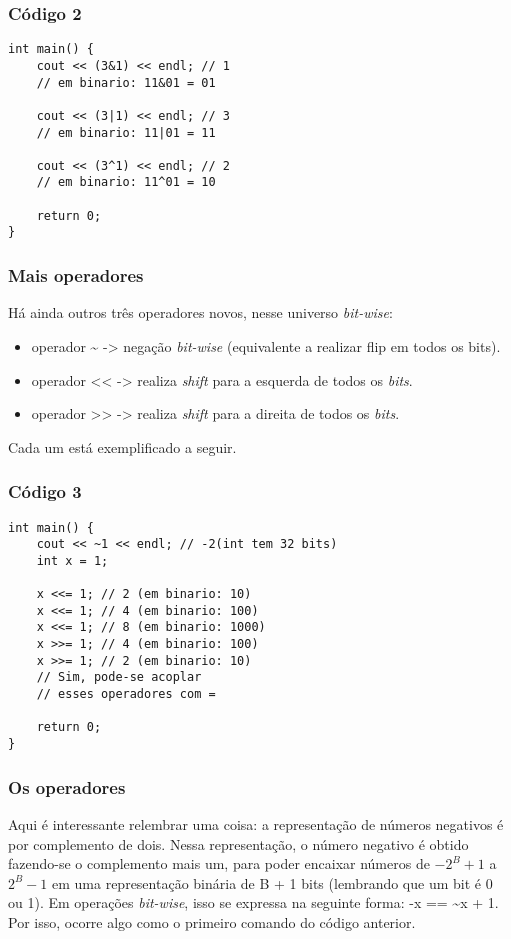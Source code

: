 \documentclass{beamer}
\begin{document}
	\begin{frame}[fragile]
	\frametitle{Código 2}
		\begin{lstlisting}
int main() {
    cout << (3&1) << endl; // 1
    // em binario: 11&01 = 01
	
    cout << (3|1) << endl; // 3
    // em binario: 11|01 = 11

    cout << (3^1) << endl; // 2
    // em binario: 11^01 = 10

    return 0;
}
		\end{lstlisting}
	\end{frame}

	\begin{frame}
	\frametitle{Mais operadores}
	Há ainda outros três operadores novos, nesse universo \textit{bit-wise}:

	\begin{itemize}
		\item operador \~{} -> negação \textit{bit-wise} (equivalente a realizar flip em todos
		os bits).
		\item operador << -> realiza \textit{shift} para a esquerda de todos os \textit{bits}.
		\item operador >> -> realiza \textit{shift} para a direita de todos os \textit{bits}.
	\end{itemize}
	Cada um está exemplificado a seguir.
	\end{frame}

	\begin{frame}[fragile]
	\frametitle{Código 3}
		\begin{lstlisting}
int main() {
    cout << ~1 << endl; // -2(int tem 32 bits)
    int x = 1;

    x <<= 1; // 2 (em binario: 10)
    x <<= 1; // 4 (em binario: 100)
    x <<= 1; // 8 (em binario: 1000)
    x >>= 1; // 4 (em binario: 100)
    x >>= 1; // 2 (em binario: 10)
    // Sim, pode-se acoplar
    // esses operadores com =

    return 0;
}
		\end{lstlisting}
	\end{frame}

	\begin{frame}
	\frametitle{Os operadores}
	Aqui é interessante relembrar uma coisa: a representação de números negativos é
	por complemento de dois. Nessa representação, o número negativo é obtido fazendo-se
	o complemento mais um, para poder encaixar números de $-2^{B} + 1$ a $2^{B} - 1$ em
	uma representação binária de B + 1 bits (lembrando que um bit é 0 ou 1). Em operações
	\textit{bit-wise}, isso se expressa na seguinte forma: -x == \~{}x + 1. Por isso,
	ocorre algo como o primeiro comando do código anterior.
	\end{frame}
\end{document}
